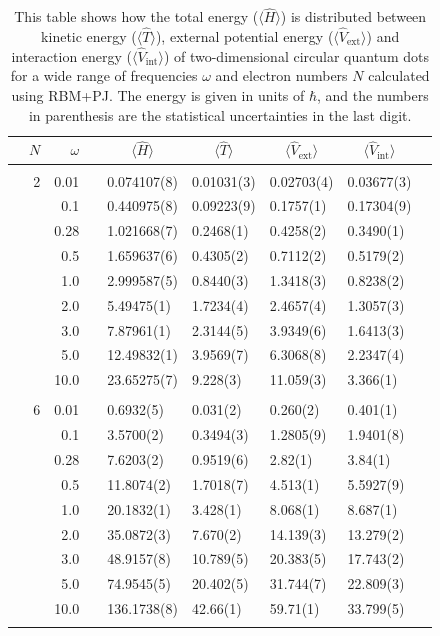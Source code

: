 \begin{table}[H]
	\caption{This table shows how the total energy ($\langle\hat{H}\rangle$) is distributed between kinetic energy ($\langle\hat{T}\rangle$), external potential energy ($\langle\hat{V}_{\text{ext}}\rangle$) and interaction energy ($\langle\hat{V}_{\text{int}}\rangle$) of two-dimensional circular quantum dots for a wide range of frequencies $\omega$ and electron numbers $N$ calculated using RBM+PJ. The energy is given in units of $\hbar$, and the numbers in parenthesis are the statistical uncertainties in the last digit.}
	\label{tab:splitfrequencyQDRBMPJ}
	\begin{tabularx}{\textwidth}{R{1cm}rrcR{2.3cm}R{2.3cm}R{2.3cm}R{2.3cm}R{1cm}} \hline\hline
		\makecell{\\ \phantom{$N$}} & $N$ & $\omega$ &&  &  &  &  & \\ \hline \\
		&2 & 0.01 && 0.074107(8) & 0.01031(3) & 0.02703(4) & 0.03677(3) \\
		&& 0.1 && 0.440975(8) & 0.09223(9) & 0.1757(1) & 0.17304(9) \\
		&& 0.28 && 1.021668(7) & 0.2468(1) & 0.4258(2) & 0.3490(1) \\
		&& 0.5 && 1.659637(6) & 0.4305(2) & 0.7112(2) & 0.5179(2) \\
		&& 1.0 && 2.999587(5) & 0.8440(3) & 1.3418(3) & 0.8238(2) \\
		&& 2.0 && 5.49475(1) & 1.7234(4) & 2.4657(4) & 1.3057(3) \\
		&& 3.0 && 7.87961(1) & 2.3144(5) & 3.9349(6) & 1.6413(3) \\
		&& 5.0 && 12.49832(1) & 3.9569(7) & 6.3068(8) & 2.2347(4) \\
		&& 10.0 && 23.65275(7) & 9.228(3) & 11.059(3) & 3.366(1) \\
		\hdashline \\
		
		&6 & 0.01 && 0.6932(5) & 0.031(2) & 0.260(2) & 0.401(1) \\
		&& 0.1 && 3.5700(2) & 0.3494(3) & 1.2805(9) & 1.9401(8) \\
		&& 0.28 && 7.6203(2) & 0.9519(6) & 2.82(1) & 3.84(1) \\
		&& 0.5 && 11.8074(2) & 1.7018(7) & 4.513(1) & 5.5927(9) \\
		&& 1.0 && 20.1832(1) & 3.428(1) & 8.068(1) & 8.687(1) \\
		&& 2.0 && 35.0872(3) & 7.670(2) & 14.139(3) & 13.279(2) \\
		&& 3.0 && 48.9157(8) & 10.789(5) & 20.383(5) & 17.743(2) \\ 
		&& 5.0 && 74.9545(5) & 20.402(5) & 31.744(7) & 22.809(3) \\
		&& 10.0 && 136.1738(8) & 42.66(1) & 59.71(1) & 33.799(5) \\
		\hdashline \\
		

\end{tabularx}
\end{table}
